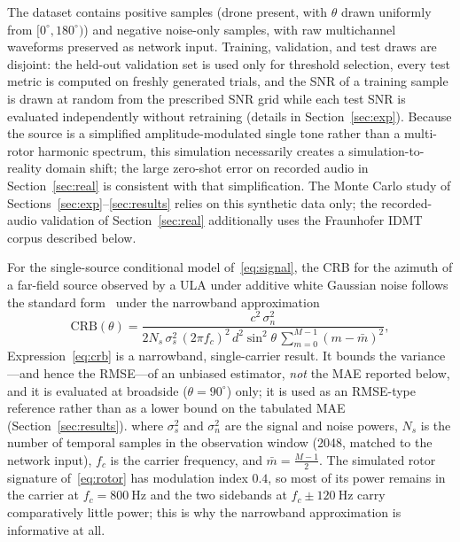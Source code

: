 \documentclass[5p,twocolumn]{elsarticle}
\begin{document}
The dataset contains positive samples (drone present, with $\theta$ drawn uniformly from $[0^\circ,180^\circ)$) and negative noise-only samples, with raw multichannel waveforms preserved as network input. Training, validation, and test draws are disjoint: the held-out validation set is used only for threshold selection, every test metric is computed on freshly generated trials, and the SNR of a training sample is drawn at random from the prescribed SNR grid while each test SNR is evaluated independently without retraining (details in Section~\ref{sec:exp}). Because the source is a simplified amplitude-modulated single tone rather than a multi-rotor harmonic spectrum, this simulation necessarily creates a simulation-to-reality domain shift; the large zero-shot error on recorded audio in Section~\ref{sec:real} is consistent with that simplification. The Monte Carlo study of Sections~\ref{sec:exp}--\ref{sec:results} relies on this synthetic data only; the recorded-audio validation of Section~\ref{sec:real} additionally uses the Fraunhofer IDMT corpus described below.

For the single-source conditional model of~\eqref{eq:signal}, the CRB for the azimuth of a far-field source observed by a ULA under additive white Gaussian noise follows the standard form~\cite{stoica1989music} under the narrowband approximation
\begin{equation}
    \mathrm{CRB}(\theta)=\frac{c^{2}\,\sigma_n^{2}}{2 N_s\,\sigma_s^{2}\,(2\pi f_c)^{2}\,d^{2}\sin^{2}\theta\,\textstyle\sum_{m=0}^{M-1}(m-\bar m)^{2}},
    \label{eq:crb}
\end{equation}
Expression~\eqref{eq:crb} is a narrowband, single-carrier result. It bounds the variance---and hence the RMSE---of an unbiased estimator, \emph{not} the MAE reported below, and it is evaluated at broadside ($\theta=90^\circ$) only; it is used as an RMSE-type reference rather than as a lower bound on the tabulated MAE (Section~\ref{sec:results}).
where $\sigma_s^{2}$ and $\sigma_n^{2}$ are the signal and noise powers, $N_s$ is the number of temporal samples in the observation window (2048, matched to the network input), $f_c$ is the carrier frequency, and $\bar m=\frac{M-1}{2}$. The simulated rotor signature of~\eqref{eq:rotor} has modulation index $0.4$, so most of its power remains in the carrier at $f_c=\SI{800}{\hertz}$ and the two sidebands at $f_c\pm\SI{120}{\hertz}$ carry comparatively little power; this is why the narrowband approximation is informative at all.
\end{document}
